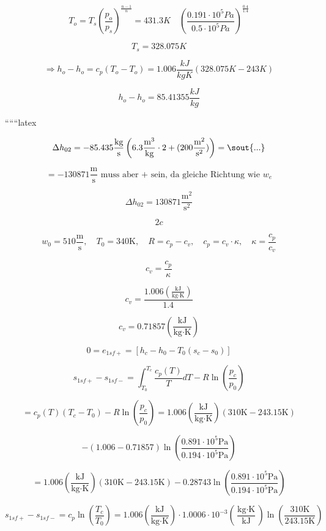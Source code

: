 \[
T_o = T_s \left( \frac{p_o}{p_s} \right)^{\frac{n-1}{n}} = 431.3 K \quad \left( \frac{0.191 \cdot 10^5 Pa}{0.5 \cdot 10^5 Pa} \right)^{\frac{0.4}{1.4}}
\]

\[
T_s = 328.075 K
\]

\[
\Rightarrow h_o - h_o = c_p (T_o - T_o) = 1.006 \frac{kJ}{kgK} (328.075 K - 243 K)
\]

\[
h_o - h_o = 85.41355 \frac{kJ}{kg}
\]

``````latex

\[
\Delta h_{02} = -85.435 \frac{\text{kg}}{\text{s}} \left( 6.3 \frac{\text{m}^3}{\text{kg}} \cdot 2 + (200 \frac{\text{m}^2}{\text{s}^2}) \right) = \text{\sout{...}}
\]

\[
= -130871 \frac{\text{m}}{\text{s}} \text{ muss aber + sein, da gleiche Richtung wie } w_e
\]

\[
\Delta h_{02} = 130871 \frac{\text{m}^2}{\text{s}^2}
\]

\[
2c
\]

\[
w_0 = 510 \frac{\text{m}}{\text{s}}, \quad T_0 = 340 \text{K}, \quad R = c_p - c_v, \quad c_p = c_v \cdot \kappa, \quad \kappa = \frac{c_p}{c_v}
\]

\[
c_v = \frac{c_p}{\kappa}
\]

\[
c_v = \frac{1.006 \left( \frac{\text{kJ}}{\text{kg} \cdot \text{K}} \right)}{1.4}
\]

\[
c_v = 0.71857 \left( \frac{\text{kJ}}{\text{kg} \cdot \text{K}} \right)
\]

\[
0 = e_{1sf+} = \left[ h_c - h_0 - T_0 (s_c - s_0) \right]
\]

\[
s_{1sf+} - s_{1sf-} = \int_{T_0}^{T_c} \frac{c_p(T)}{T} dT - R \ln \left( \frac{p_c}{p_0} \right)
\]

\[
= c_p(T) \left( T_c - T_0 \right) - R \ln \left( \frac{p_c}{p_0} \right) = 1.006 \left( \frac{\text{kJ}}{\text{kg} \cdot \text{K}} \right) (310 \text{K} - 243.15 \text{K})
\]

\[
- \left( 1.006 - 0.71857 \right) \ln \left( \frac{0.891 \cdot 10^5 \text{Pa}}{0.194 \cdot 10^5 \text{Pa}} \right)
\]

\[
= 1.006 \left( \frac{\text{kJ}}{\text{kg} \cdot \text{K}} \right) \left( 310 \text{K} - 243.15 \text{K} \right) - 0.28743 \ln \left( \frac{0.891 \cdot 10^5 \text{Pa}}{0.194 \cdot 10^5 \text{Pa}} \right)
\]

\[
s_{1sf+} - s_{1sf-} = c_p \ln \left( \frac{T_c}{T_0} \right) = 1.006 \left( \frac{\text{kJ}}{\text{kg} \cdot \text{K}} \right) \cdot 1.0006 \cdot 10^{-3} \left( \frac{\text{kg} \cdot \text{K}}{\text{kJ}} \right) \ln \left( \frac{310 \text{K}}{243.15 \text{K}} \right)
\]

